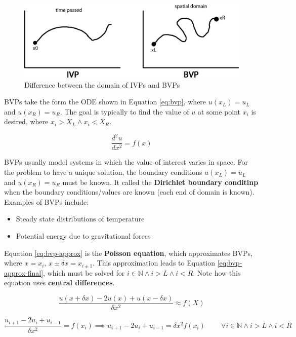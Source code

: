 \documentclass{article}
\begin{document}
\begin{figure}
	\centering
	\includegraphics[scale=0.3]{figures/ivp-bvp-comparison.png}
	\caption{Difference between the domain of IVPs and BVPs}
	\label{fig:ivp-bvp-comparison}
\end{figure}

BVPs take the form the ODE shown in Equation \ref{eq:bvp}, where $u(x_L) = u_L$ and $u(x_R) = u_R$. The goal is typically to find the value of $u$ at some point $x_i$ is desired, where $x_i > X_L \land x_i < X_R$.

\begin{equation}
	\frac{d^2 u}{dx^2} = f(x)
	\label{eq:bvp}
\end{equation}

BVPs usually model systems in which the value of interest varies in space. For the problem to have a unique solution, the boundary conditions $u(x_L) = u_L$ and $u(x_R) = u_R$ must be known. It called the \textbf{Dirichlet boundary conditinp} when the boundary conditions/values are known (each end of domain is known). Examples of BVPs include:
\begin{itemize}
	\item Steady state distributions of temperature
	\item Potential energy due to gravitational forces
\end{itemize}

Equation \ref{eq:bvp-approx} is the \textbf{Poisson equation}, which approximates BVPs, where $x = x_i$, $x \pm \delta x = x_{i \pm 1}$. This approximation leads to Equation \ref{eq:bvp-approx-final}, which must be solved for $i \in \mathbb{N} \land i > L \land i < R$. Note how this equation uses \textbf{central differences}.

\begin{equation}
	\frac{u(x + \delta x) - 2u(x) + u(x - \delta x)}{\delta x^2} \approx f(X)
	\label{eq:bvp-approx}
\end{equation}

\begin{equation}
	\frac{u_{i+1} - 2u_i + u_{i - 1}}{\delta x^2} = f(x_i)
	\implies
	u_{i+1} - 2u_i + u_{i - 1} = \delta x^2 f(x_i) 
	\;\;\;\;\;\;\;\; \forall 
	i \in \mathbb{N} \land i > L \land i < R
	\label{eq:bvp-approx-final}
\end{equation}
\end{document}
